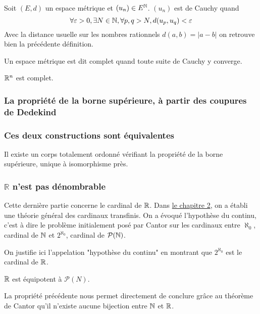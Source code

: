 \begin{defini}
    Soit $(E,d)$ un espace métrique et $(u_n) \in E^{\mathbb{N}}$. $(u_n)$ est de Cauchy quand
    $$\forall \varepsilon > 0, \exists N \in \mathbb{N}, \forall p, q > N, d(u_p, u_q) < \varepsilon$$
    \tcblower
    Avec la distance usuelle sur les nombres rationnels $d(a,b)=|a-b|$ on retrouve bien la précédente définition.
\end{defini}

\begin{defini}
    Un espace métrique est dit complet quand toute suite de Cauchy y converge.
\end{defini}

\begin{ex}
    $\mathbb{R}^n$ est complet.
    \tcblower
\end{ex}



\subsubsection{La propriété de la borne supérieure, à partir des coupures de Dedekind}

\subsubsection{Ces deux constructions sont équivalentes}
\begin{theoreme}
    Il existe un corps totalement ordonné vérifiant la propriété de la borne supérieure, unique à isomorphisme près.    
\end{theoreme}

\subsubsection{$\mathbb{R}$ n'est pas dénombrable}
Cette dernière partie concerne le cardinal de $\mathbb{R}$. Dans \hyperref[card]{le chapitre 2}, on a établi une théorie général des cardinaux transfinis. On a évoqué l'hypothèse du continu, c'est à dire le problème initialement posé par Cantor sur les cardinaux entre $\aleph_0$, cardinal de $\mathbb{N}$ et $2^{\aleph_0}$, cardinal de $\mathcal{P}(\mathbb{N})$.

On justifie ici l'appelation "hypothèse du continu" en montrant que $2^{\aleph_0}$ est le cardinal de $\mathbb{R}$.

\begin{theoreme}
    $\mathbb{R}$ est équipotent à $\mathcal{P}(N)$.
    \tcblower
\end{theoreme}

\begin{theoreme}
    La propriété précédente nous permet directement de conclure grâce au théorème de Cantor qu'il n'existe aucune bijection entre $\mathbb{N}$ et $\mathbb{R}$. 
\end{theoreme}